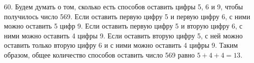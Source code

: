 60. Будем думать о том, сколько есть способов оставить цифры 5, 6 и 9, чтобы получилось число 569. Если оставить первую цифру 5 и первую цифру 6, с ними можно оставить 5 цифр 9. Если оставить первую цифру 5 и вторую цифру 6, с ними можно оставить 4 цифры 9. Если оставить вторую цифру 5, с ней можно оставить только вторую цифру 6 и с ними можно оставить 4 цифры 9. Таким образом, общее количество способов оставить число 569 равно $5+4+4=13.$\\
